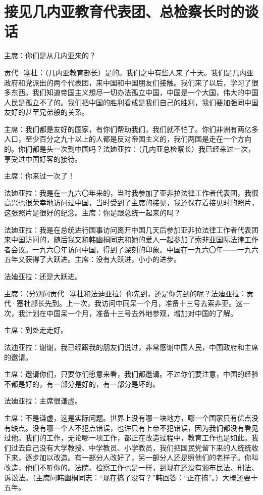 \section[接见几内亚教育代表团、总检察长时的谈话（一九六五年八月八日）]{接见几内亚教育代表团、总检察长时的谈话}


主席：你们是从几内亚来的？

贡代·塞杜：（几内亚教育部长）是的。我们之中有些人来了十天。我们是几内亚政府和党派出的两个代表团，来中国和中国朋友们接触。我们来了以后，学习了很多东西。我们知道帝国主义想尽一切办法孤立中国，中国是一个大国，伟大的中国人民是孤立不了的。我们把中国的胜利看成是我们自己的胜利，我们要加强同中国友好的甚至兄弟般的关系。

主席：我们都是友好的国家，有你们帮助我们，我们就不怕了。你们非洲有两亿多人口，至少百分之九十以上的人都是反对帝国主义的，我们两国是走在一个方向的。你们都是头一次到中国吗？法廸亚拉：（几内亚总检察长）我已经来过一次，享受过中国好客的接待。

主席：你来过一次了！

法廸亚拉：我是在一九六〇年来的，当时我参加了亚非拉法律工作者代表团，我很高兴也很荣幸地访问过中国，当时受到了主席的接见，我还保存着接见时的照片，这张照片是很好的纪念。主席：你是跟总统一起来的吗？

法廸亚拉：我是在总统进行国事访问离开中国几天后参加亚非拉法律工作者代表团来中国访问的，随后我又和韩幽桐同志和她的爱人一起参加了索非亚国际法律工作者会议。一九六〇年访问中国，得到了深刻的印象。中国在一九六〇年——一九六五年又获得了大跃进。主席：没有大跃进，小小的进步。

法廸亚拉：还是大跃进。

主席：（分别问贡代·塞杜和法迪亚拉）你先到，还是你先到的呢？法廸亚拉：贡代·塞杜部长先到。上一次，我访问中同呆一个月，准备十三号去索非亚。这一次，我计划在中国呆一个月，准备十三号去外地参观，增加对中国的了解。

主席：到处走走好。

法迪亚拉：谢谢，我已经跟我的朋友们说过，非常感谢中国人民，中国政府和主席的邀请。

主席：邀请你们，只要你们愿意来看，我们都邀请。不过你们要注意，中国的经验不都是好的，有一部分是好的，有一部分是坏的。

法廸亚拉：主席很谦虚。

主席：不是谦虚，这是实际问题。世界上没有哪一块地方，哪一个国家只有优点没有缺点。没有哪一个人不犯点错误，也许只有上帝不犯错误，因为我们都没有看见过他。我们的工作，无论哪一项工作，都正在改造过程中，教育工作也是如此。我们过去自己没有大学教授、中学教员、小学教员，我们把国民党留下来的人统统收下来，逐步加以改造。有一部分人改好了，另一部分人还是照他们的老样子。你叫改造，他们不听你的。法院、检察工作也是一样，到现在还没有颁布民法、刑法、诉讼法。（主席问韩幽桐同志：“现在搞了没有？”韩回答：“正在搞”。）大概还要十五年。

